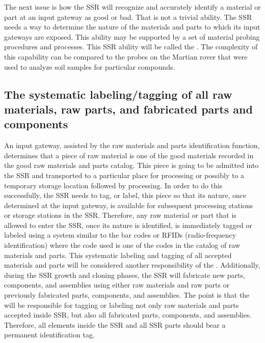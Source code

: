The next issue is how the SSR
will recognize and accurately identify a material or part at an input
gateway as good or bad. That is not a trivial ability. 
The SSR needs a way to
determine the nature of the materials and parts 
to which its input gateways are exposed.
This ability may be supported by a set of material probing
procedures and processes. This SSR ability will be called the
. 
The complexity of this capability can be compared to the probes on the Martian rover that were used to analyze soil samples for particular compounds.

\subsection[The systematic labeling/tagging of all raw materials, raw parts, and fabricated parts and components]{The systematic labeling/tagging of all raw materials, raw parts, and fabricated parts
and components}

An input gateway,
assisted by the raw materials and parts identification function,
determines that a piece of raw material is one of the good materials
recorded in the good raw materials and parts catalog. This piece is
going to be admitted into the SSR and transported to a particular place
for processing or possibly to a temporary storage location followed by
processing.  In order to do this successfully, the SSR needs
to tag, or label, this piece so that its nature, once
determined at the input gateway, is available for
subsequent processing stations or storage stations in the SSR. Therefore,
any raw material or part that is allowed to enter the SSR, once
its nature is identified, is immediately tagged or labeled using a system
similar to the bar codes or RFIDs (radio-frequency identification)
where the code used is one of the codes in the catalog of raw materials
and parts. This systematic labeling and tagging of all accepted
materials and parts will be considered another responsibility of the
.  Additionally,
during the SSR growth and cloning phases, the SSR will fabricate new parts, components, and assemblies
using either raw materials and raw parts or previously fabricated
parts, components, and assemblies. The point is that the 
will be responsible for tagging or labeling not
only raw materials and parts accepted inside SSR, but also all
fabricated parts, components, and assemblies. Therefore,
all elements inside the SSR and all SSR parts should bear
a permanent identification tag.


